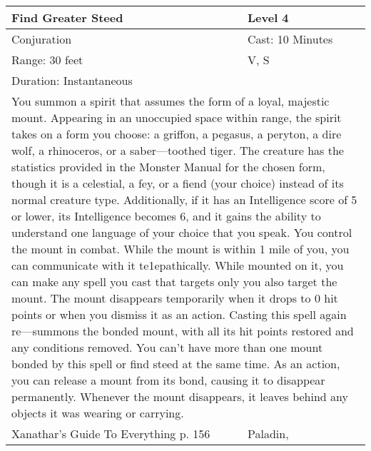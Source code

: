 \documentclass[11pt]{report}
\begin{document}
\begin{table}[H]
	\begin{tabular}{||p{6cm}|p{6cm}||}
		\hline\hline
		\bf{Find Greater Steed} & Level 4\\ \hline
		Conjuration & Cast: 10 Minutes\\ \hline
		Range: 30 feet & V, S\\ \hline
		Duration: Instantaneous & \\ \hline
		\multicolumn{2}{||p{12cm}||}{You summon a spirit that assumes the form of a loyal, majestic mount. Appearing in an unoccupied space within range, the spirit takes on a form you choose: a griffon, a pegasus, a peryton, a dire wolf, a rhinoceros, or a saber—toothed tiger. The creature has the statistics provided in the Monster Manual for the chosen form, though it is a celestial, a fey, or a fiend (your choice) instead of its normal creature type. Additionally, if it has an Intelligence score of 5 or lower, its Intelligence becomes 6, and it gains the ability to understand one language of your choice that you speak. You control the mount in combat. While the mount is within 1 mile of you, you can communicate with it te1epathically. While mounted on it, you can make any spell you cast that targets only you also target the mount. The mount disappears temporarily when it drops to 0 hit points or when you dismiss it as an action. Casting this spell again re—summons the bonded mount, with all its hit points restored and any conditions removed. You can’t have more than one mount bonded by this spell or find steed at the same time. As an action, you can release a mount from its bond, causing it to disappear permanently. Whenever the mount disappears, it leaves behind any objects it was wearing or carrying.}\\ \hline
Xanathar's Guide To Everything p. 156 & Paladin, \\ \hline\hline
	\end{tabular}
\end{table}
\end{document}
